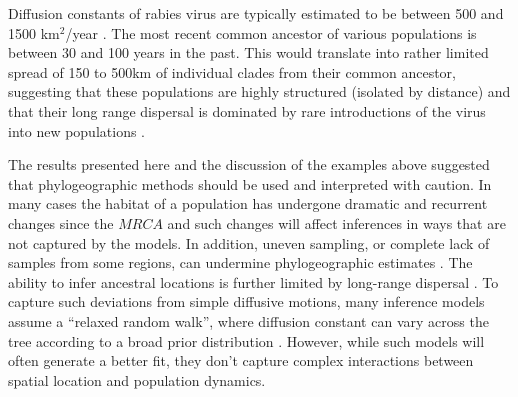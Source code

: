 \documentclass[aps,rmp, twocolumn]{revtex4}
\begin{document}
Diffusion constants of rabies virus are typically estimated to be between 500 and 1500 km$^2$/year \citep{dellicour_using_2017}.
The most recent common ancestor of various populations is between 30 and 100 years in the past.
This would translate into rather limited spread of 150 to 500km of individual clades from their common ancestor, suggesting that these populations are highly structured (isolated by distance) and that their long range dispersal is dominated by rare introductions of the virus into new populations \citep{brunker_elucidating_2015}.



The results presented here and the discussion of the examples above suggested that phylogeographic methods should be used and interpreted with caution.
In many cases the habitat of a population has undergone dramatic and recurrent changes since the $MRCA$ and such changes will affect inferences in ways that are not captured by the models.
In addition, uneven sampling, or complete lack of samples from some regions, can undermine phylogeographic estimates \citep{kalkauskas_sampling_2021,layan_impact_2023}.
The ability to infer ancestral locations is further limited by long-range dispersal \citep{hallatschek_acceleration_2014}.
To capture such deviations from simple diffusive motions, many inference models assume a ``relaxed random walk'', where diffusion constant can vary across the tree according to a broad prior distribution \citep{dellicour_relax_2021}.
However, while such models will often generate a better fit, they don't capture complex interactions between spatial location and population dynamics.
\end{document}
